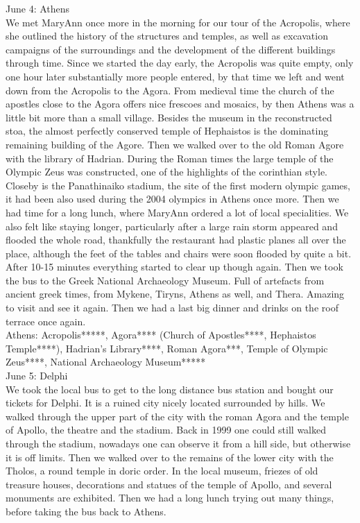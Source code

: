 June 4: Athens\\
We met MaryAnn once more in the morning for our tour of the Acropolis, where she outlined the history of the structures and temples, as well as excavation campaigns of the surroundings and the development of the different buildings through time. Since we started the day early, the Acropolis was quite empty, only one hour later substantially more people entered, by that time we left and went down from the Acropolis to the Agora. From medieval time the church of the apostles close to the Agora offers nice frescoes and mosaics, by then Athens was a little bit more than a small village. Besides the museum in the reconstructed stoa, the almost perfectly conserved temple of Hephaistos is the dominating remaining building of the Agore. Then we walked over to the old Roman Agore with the library of Hadrian. During the Roman times the large temple of the Olympic Zeus was constructed, one of the highlights of the corinthian style. Closeby is the Panathinaiko stadium, the site of the first modern olympic games, it had been also used during the 2004 olympics in Athens once more. Then we had time for a long lunch, where MaryAnn ordered a lot of local specialities. We also felt like staying longer, particularly after a large rain storm appeared and flooded the whole road, thankfully the restaurant had plastic planes all over the place, although the feet of the tables and chairs were soon flooded by quite a bit. After 10-15 minutes everything started to clear up though again. Then we took the bus to the Greek National Archaeology Museum. Full of artefacts from ancient greek times, from Mykene, Tiryns, Athens as well, and Thera. Amazing to visit and see it again. Then we had a last big dinner and drinks on the roof terrace once again.\\

Athens: Acropolis*****, Agora**** (Church of Apostles****, Hephaistos Temple****), Hadrian's Library****, Roman Agora***, Temple of Olympic Zeus****, National Archaeology Museum*****\\

June 5: Delphi\\
We took the local bus to get to the long distance bus station and bought our tickets for Delphi. It is a ruined city nicely located surrounded by hills. We walked through the upper part of the city with the roman Agora and the temple of Apollo, the theatre and the stadium. Back in 1999 one could still walked through the stadium, nowadays one can observe it from a hill side, but otherwise it is off limits. Then we walked over to the remains of the lower city with the Tholos, a round temple in doric order. In the local museum, friezes of old treasure houses, decorations and statues of the temple of Apollo, and several monuments are exhibited. Then we had a long lunch trying out many things, before taking the bus back to Athens.\\

